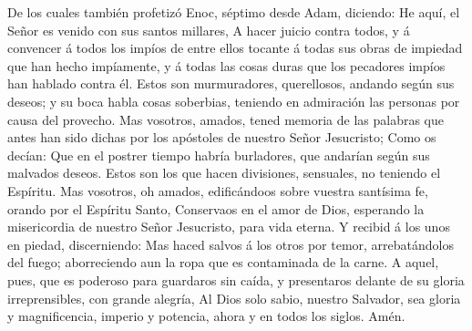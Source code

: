  De los cuales también profetizó Enoc, séptimo desde
Adam, diciendo: He aquí, el Señor es venido con sus santos millares,
 A hacer juicio contra todos, y á convencer á todos los
impíos de entre ellos tocante á todas sus obras de impiedad que han
hecho impíamente, y á todas las cosas duras que los pecadores impíos han
hablado contra él.  Estos son murmuradores, querellosos,
andando según sus deseos; y su boca habla cosas soberbias, teniendo en
admiración las personas por causa del provecho.  Mas
vosotros, amados, tened memoria de las palabras que antes han sido
dichas por los apóstoles de nuestro Señor Jesucristo; 
Como os decían: Que en el postrer tiempo habría burladores, que andarían
según sus malvados deseos.  Estos son los que hacen
divisiones, sensuales, no teniendo el Espíritu.  Mas
vosotros, oh amados, edificándoos sobre vuestra santísima fe, orando por
el Espíritu Santo,  Conservaos en el amor de Dios,
esperando la misericordia de nuestro Señor Jesucristo, para vida eterna.
 Y recibid á los unos en piedad, discerniendo:
 Mas haced salvos á los otros por temor, arrebatándolos
del fuego; aborreciendo aun la ropa que es contaminada de la carne.
 A aquel, pues, que es poderoso para guardaros sin caída,
y presentaros delante de su gloria irreprensibles, con grande alegría,
 Al Dios solo sabio, nuestro Salvador, sea gloria y
magnificencia, imperio y potencia, ahora y en todos los siglos. Amén.
